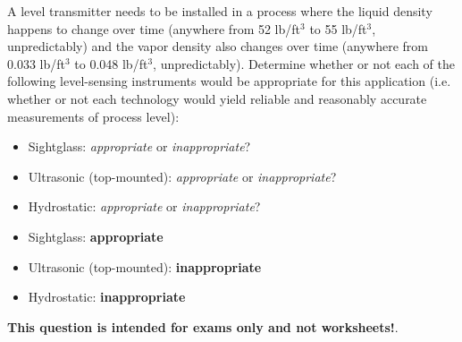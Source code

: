 

A level transmitter needs to be installed in a process where the liquid density happens to change over time (anywhere from 52 lb/ft$^{3}$ to 55 lb/ft$^{3}$, unpredictably) and the vapor density also changes over time (anywhere from 0.033 lb/ft$^{3}$ to 0.048 lb/ft$^{3}$, unpredictably).  Determine whether or not each of the following level-sensing instruments would be appropriate for this application (i.e. whether or not each technology would yield reliable and reasonably accurate measurements of process level):

\begin{itemize}
\item{} Sightglass: {\it appropriate} or {\it inappropriate}?
\vskip 10pt
\item{} Ultrasonic (top-mounted): {\it appropriate} or {\it inappropriate}?
\vskip 10pt
\item{} Hydrostatic: {\it appropriate} or {\it inappropriate}?
\end{itemize}







\begin{itemize}
\item{} Sightglass: {\bf appropriate}
\vskip 10pt
\item{} Ultrasonic (top-mounted): {\bf inappropriate}
\vskip 10pt
\item{} Hydrostatic: {\bf inappropriate}
\end{itemize}







{\bf This question is intended for exams only and not worksheets!}.



